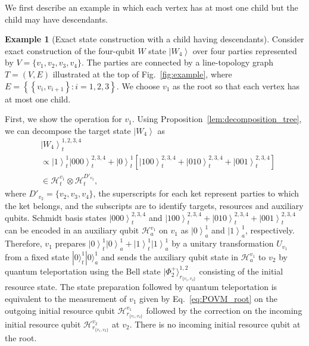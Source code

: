 \documentclass[preprintnumbers,aps,amsmath,amssymb,pra,twocolumn,showpacs,superscriptaddress,floatfix]{revtex4-1}
\def\Ket#1{\left|#1\right\rangle}
\newcommand{\ket}[1]{|{#1}\rangle}
\theoremstyle{plain}
\theoremstyle{definition}
\newtheorem{example}{Example}
\theoremstyle{remark}
\begin{document}
We first describe an example in which each vertex has at most one child but the child may have descendants.
\begin{example}[\label{ex:1}Exact state construction with a child having descendants]
Consider exact construction of the four-qubit $W$ state $\Ket{W_4}$ over four parties represented by $V = \{v_1, v_2, v_3, v_4\}$.
The parties are connected by a line-topology graph $T=(V, E)$ illustrated at the top of Fig.~\ref{fig:example}, where $E=\left\{\left\{v_i, v_{i+1}\right\}:i=1,2,3\right\}$.
We choose $v_1$ as the root so that each vertex has at most one child.

First, we show the operation for $v_1$.
Using Proposition~\ref{lem:decomposition_tree}, we can decompose the target state $\Ket{W_4}$ as
\begin{align*}
  &\Ket{W_4}_t^{1,2,3,4}\\
  &\propto\Ket{1}_t^1\Ket{000}_t^{2,3,4} +\Ket{0}_t^{1}\left[\Ket{100}_t^{2,3,4}+\Ket{010}_t^{2,3,4}+\Ket{001}_t^{2,3,4}\right]\\
  &\in\mathcal{H}_t^{v_1}\otimes\mathcal{H}_t^{D'_{v_2}},
\end{align*}
where $D'_{v_2}=\{v_2,v_3,v_4\}$, the superscripts for each ket represent parties to which the ket belongs, and the subscripts are to identify targets, resources and auxiliary qubits.
Schmidt basis states $\Ket{000}_t^{2,3,4}$ and  $\Ket{100}_t^{2,3,4}+\Ket{010}_t^{2,3,4}+\Ket{001}_t^{2,3,4}$ can be encoded in an auxiliary qubit $\mathcal{H}_a^{v_1}$ on $v_1$ as $\Ket{0}_a^1$ and $\Ket{1}_a^1$, respectively.
Therefore, $v_1$ prepares $\Ket{0}_t^1\Ket{0}_a^1+\Ket{1}_t^1\Ket{1}_a^1$ by a unitary transformation $U_{v_1}$ from a fixed state $\ket{0}_t^1  \ket{0}_a^1$ and sends the auxiliary qubit state in $\mathcal{H}_a^{v_1}$ to $v_2$ by quantum teleportation using the Bell state $\ket{\Phi_2^+}_{r_{\{v_1,v_2\}}}^{1,2}$ consisting of the initial resource state. The state preparation followed by quantum teleportation is equivalent to the measurement of $v_1$ given by Eq.~\eqref{eq:POVM_root} on the outgoing initial resource qubit $\mathcal{H}_{r_{\{v_1,v_2\}}}^{v_1}$  followed by the correction on the incoming initial resource qubit $\mathcal{H}_{r_{\{v_1,v_2\}}}^{v_2}$  at $v_2$.  There is no incoming initial resource qubit at the root.


\end{example}
\end{document}
